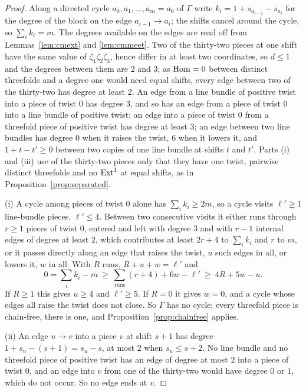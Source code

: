 \begin{proof}
Along a directed cycle $a_{0},a_{1},\dots,a_{m}=a_{0}$ of $\Gamma$ write $k_{i}=1+s_{a_{i-1}}-s_{a_{i}}$ for the degree of the block on the edge $a_{i-1}\to a_{i}$; the shifts cancel around the cycle, so $\sum_{i}k_{i}=m$. The degrees available on the edges are read off from Lemmas~\ref{lem:cmext} and \ref{lem:cmmeet}. Two of the thirty-two pieces at one shift have the same value of $\zeta_{1}\zeta_{2}\zeta_{3}$, hence differ in at least two coordinates, so $d\le1$ and the degrees between them are $2$ and $3$; as $\mathrm{Hom}=0$ between distinct threefolds and a degree one would need equal shifts, every edge between two of the thirty-two has degree at least $2$. An edge from a line bundle of positive twist into a piece of twist $0$ has degree $3$, and so has an edge from a piece of twist $0$ into a line bundle of positive twist; an edge into a piece of twist $0$ from a threefold piece of positive twist has degree at least $3$; an edge between two line bundles has degree $0$ when it raises the twist, $6$ when it lowers it, and $1+t-t'\ge0$ between two copies of one line bundle at shifts $t$ and $t'$. Parts (i) and (iii) use of the thirty-two pieces only that they have one twist, pairwise distinct threefolds and no $\mathrm{Ext}^{1}$ at equal shifts, as in Proposition~\ref{prop:separated}.

(i) A cycle among pieces of twist $0$ alone has $\sum_{i}k_{i}\ge2m$, so a cycle visits $\ell'\ge1$ line-bundle pieces, $\ell'\le4$. Between two consecutive visits it either runs through $r\ge1$ pieces of twist $0$, entered and left with degree $3$ and with $r-1$ internal edges of degree at least $2$, which contributes at least $2r+4$ to $\sum_{i}k_{i}$ and $r$ to $m$, or it passes directly along an edge that raises the twist, $u$ such edges in all, or lowers it, $w$ in all. With $R$ runs, $R+u+w=\ell'$ and
\[
0=\sum_{i}k_{i}-m\ \ge\ \sum_{\mathrm{runs}}(r+4)+6w-\ell'\ \ge\ 4R+5w-u .
\]
If $R\ge1$ this gives $u\ge4$ and $\ell'\ge5$. If $R=0$ it gives $w=0$, and a cycle whose edges all raise the twist does not close. So $\Gamma$ has no cycle; every threefold piece is chain-free, there is one, and Proposition~\ref{prop:chainfree} applies.

(ii) An edge $u\to v$ into a piece $v$ at shift $s+1$ has degree $1+s_{u}-(s+1)=s_{u}-s$, at most $2$ when $s_{u}\le s+2$. No line bundle and no threefold piece of positive twist has an edge of degree at most $2$ into a piece of twist $0$, and an edge into $v$ from one of the thirty-two would have degree $0$ or $1$, which do not occur. So no edge ends at $v$.


\end{proof}
